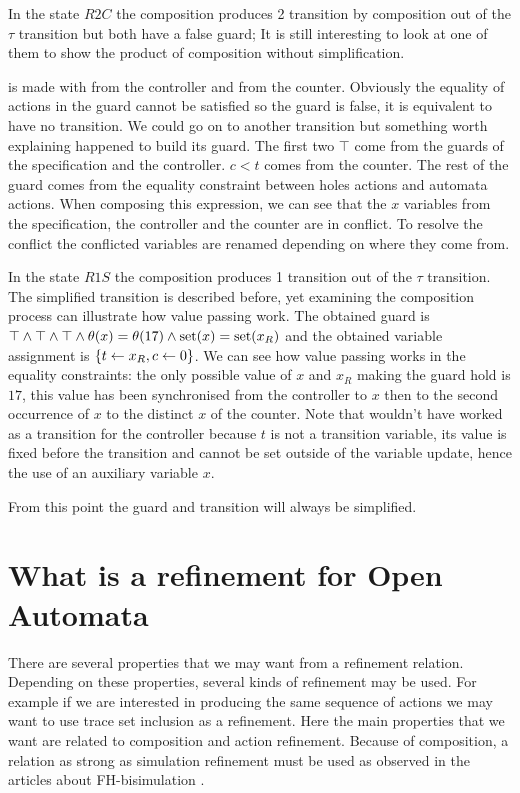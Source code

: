 \documentclass{article}
\begin{document}
\begin{exi}
In the state \(R2C\) the composition produces 2 transition by composition out of the \(\tau\) transition but both have a false guard; It is still interesting to look at one of them to show the product of composition without simplification.

 is made with  from the controller and  from the counter.
Obviously the equality of actions in the guard cannot be satisfied so the guard is false, it is equivalent to have no transition.
We could go on to another transition but something worth explaining happened to build its guard.
The first two \(\top\) come from the guards of the specification and the controller.
\(c < t\) comes from the counter.
The rest of the guard comes from the equality constraint between holes actions and automata actions.
When composing this expression, we can see that the \(x\) variables from the specification, the controller and the counter are in conflict.
To resolve the conflict the conflicted variables are renamed depending on where they come from.

In the state \(R1S\) the composition produces 1 transition out of the \(\tau\) transition.
The simplified transition is described before, yet examining the composition process can illustrate how value passing work.
The obtained guard is \(\top \wedge \top \wedge \top \wedge \theta{\left(x\right)} = \theta{\left(17\right)} \wedge \mathrm{set}{\left(x\right)} = \mathrm{set}{\left(x_R\right)}\) and the obtained variable assignment is \({\left\{t \gets x_R, c \gets 0\right\}}\).
We can see how value passing works in the equality constraints: the only possible value of \(x\) and \(x_R\) making the guard hold is \(17\), this value has been synchronised from the controller to \(x\) then to the second occurrence of \(x\) to the distinct \(x\) of the counter.
Note that  wouldn't have worked as a transition for the controller because \(t\) is not a transition variable, its value is fixed before the transition and cannot be set outside of the variable update, hence the use of an auxiliary variable \(x\).

From this point the guard and transition will always be simplified.
\end{exi}


\section{What is a refinement for Open Automata}\label{sec:proofelts}
There are several properties that we may want from a refinement relation.
Depending on these properties, several kinds of refinement may be used.
For example if we are interested in producing the same sequence of actions we may want to use trace set inclusion as a refinement.
Here the main properties that we want are related to composition and action refinement.
Because of composition, a relation as strong as simulation refinement must be used as observed in the articles about FH-bisimulation \cite{henrio:01055091}.
\end{document}
